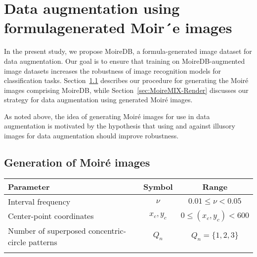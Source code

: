\section{Data augmentation using formulagenerated Moir´e images}
\label{sec:method}

In the present study, we propose MoireDB, a formula-generated image
dataset for data augmentation. Our goal is to ensure that
training on MoireDB-augmented image datasets
increases the robustness of image recognition models
for classification tasks. Section~\ref{sec:MoireDB-Render}
describes our procedure for generating the Moir\'e images
comprising MoireDB, while Section~\ref{sec:MoireMIX-Render}
discusses our strategy for data augmentation using
generated Moir\'e images.



As noted above, the idea of generating Moir\'e images
for use in data augmentation is motivated by the hypothesis
that using and against illusory images for data augmentation should
improve robustness.

\subsection{Generation of Moir\'e images}
\label{sec:MoireDB-Render}



\begin{table*}[t]
    \vspace{12pt}
    \caption{Adjustable parameters for auto-generated Moir\'e images}
    \centering
    \vspace{-8pt}
    \begin{tabular}{lc|c} \toprule[0.8pt]
        Parameter                    & Symbol     & Range \\\midrule[0.8pt]
%
        Interval frequency           & $\nu$      & $0.01\leq \nu < 0.05$ \\[1ex]
%
        Center-point coordinates           & $x_c, y_c$ & $0\leq (x_c, y_c) < 600$  \\[1ex]
%
         Number of superposed concentric-circle patterns & $Q_n$       & $Q_n = \{1, 2, 3\}$  \\
        \bottomrule[0.8pt] \\
    \end{tabular}
    \vspace{-20pt}
    \label{tab:MoireDBparam}
\end{table*}


